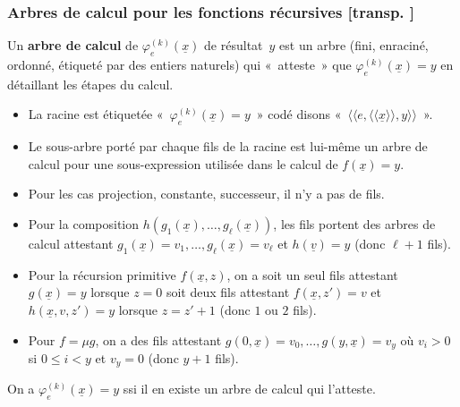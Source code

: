 \documentclass[mathserif,a4paper,aspectratio=169]{beamer}
\newcommand{\dbllangle}{\mathopen{\langle\!\langle}}
\newcommand{\dblrangle}{\mathclose{\rangle\!\rangle}}
\renewcommand{\frametitle}[1]{\subsubsection*{#1 {\footnotesize[transp. \insertframenumber]}}}
\begin{document}
\begin{frame}
\frametitle{Arbres de calcul pour les fonctions récursives}

Un \textbf{arbre de calcul} de $\varphi_e^{(k)}(\underline{x})$ de
résultat $y$ est un arbre (fini, enraciné, ordonné, étiqueté par des
entiers naturels) qui « atteste » que $\varphi_e^{(k)}(\underline{x})
= y$ en détaillant les étapes du calcul.

\medskip

\begin{itemize}
\item La racine est étiquetée « $\varphi_e^{(k)}(\underline{x}) = y$ »
  codé disons « $\dbllangle e, \dbllangle \underline{x}\dblrangle,
  y\dblrangle$ ».
\item Le sous-arbre porté par chaque fils de la racine est lui-même un
  arbre de calcul pour une sous-expression utilisée dans le calcul de
  $f(\underline{x}) = y$.
\item Pour les cas projection, constante, successeur, il n'y a pas de
  fils.
\item Pour la composition
  $h(g_1(\underline{x}),\ldots,g_\ell(\underline{x}))$, les fils
  portent des arbres de calcul attestant
  $g_1(\underline{x})=v_1,\ldots,g_\ell(\underline{x})=v_\ell$ et
  $h(\underline{v})=y$ (donc $\ell+1$ fils).
\item Pour la récursion primitive $f(\underline{x},z)$, on a soit un
  seul fils attestant $g(\underline{x})=y$ lorsque $z=0$ soit deux
  fils attestant $f(\underline{x},z')=v$ et $h(\underline{x},v,z')=y$
  lorsque $z=z'+1$ (donc $1$ ou $2$ fils).
\item Pour $f = \mu g$, on a des fils attestant
  $g(0,\underline{x})=v_0,\ldots,g(y,\underline{x})=v_y$ où $v_i>0$ si
  $0\leq i<y$ et $v_y=0$ (donc $y+1$ fils).
\end{itemize}

\medskip

On a $\varphi_e^{(k)}(\underline{x}) = y$ \alert{ssi} il en existe un
arbre de calcul qui l'atteste.

\end{frame}
%
\end{document}
